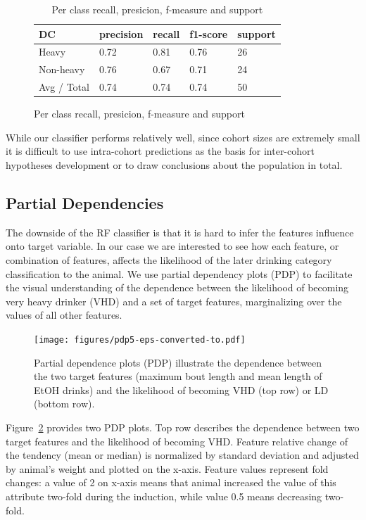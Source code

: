 \begin{table}[h]
\begin{subfigure}{\linewidth}
		\begin{tabular}{lllll}
			\toprule DC &  precision  & recall & f1-score  & support\\	\midrule
			Heavy    &   0.72   &   0.81   &   0.76    &    26 \\
			Non-heavy     &  0.76   &   0.67   &   0.71    &    24\\
			Avg / Total    &   0.74   &   0.74   &   0.74   &  50\\ \bottomrule
		\end{tabular}
		\caption{Per class recall, presicion, f-measure and support\label{table:by-cohort-cm-details-twocases}}	
	\end{subfigure}	
	\end{table}
	
	While our classifier performs relatively well, since cohort sizes are extremely small it is difficult to use intra-cohort predictions as the basis for inter-cohort hypotheses development or to draw conclusions about the population in total. 


	\subsection{Partial Dependencies}
	The downside of the RF classifier is that it is hard to infer the features influence onto target variable. In our case we are interested to see how each feature, or combination of features, affects the likelihood of the later drinking category classification to the animal. We use partial dependency plots (PDP) to facilitate the visual understanding of the dependence between the likelihood of becoming very heavy drinker (VHD) and a set of target features, marginalizing over the values of all other features. 	
	
	\begin{figure}[ht]
		\centering
		\texttt{[image: figures/pdp5-eps-converted-to.pdf]}
		\caption{Partial dependence plots (PDP) illustrate the dependence between the two target features (maximum bout length and mean length of EtOH drinks) and the likelihood of becoming VHD (top row) or LD (bottom row).}
		\label{fig:pdp5}
	\end{figure}
	
	Figure~\ref{fig:pdp5} provides two PDP plots. Top row describes the dependence between two target features and the likelihood of becoming VHD. Feature relative change of the tendency (mean or median) is normalized by standard deviation and adjusted by animal's weight and plotted on the x-axis. Feature values represent fold changes: a value of 2 on x-axis means that animal increased the value of this attribute two-fold during the induction, while value 0.5 means decreasing two-fold. 
	
